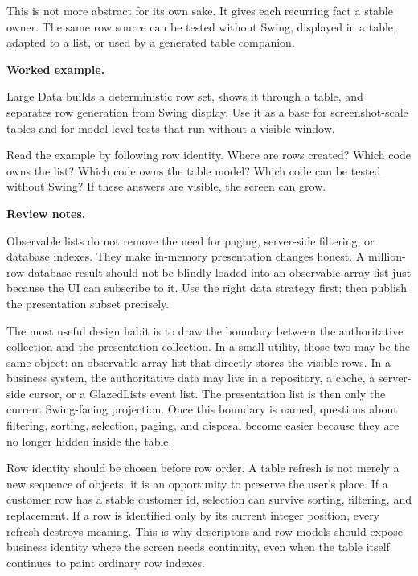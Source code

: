 This is not more abstract for its own sake. It gives each recurring fact a
stable owner. The same row source can be tested without Swing, displayed in a
table, adapted to a list, or used by a generated table companion.

\textbf{Worked example.}

\begin{examplebox}{Large Data}
\largeDataExample{} builds a deterministic row set, shows it through a table,
and separates row generation from Swing display. Use it as a base for
screenshot-scale tables and for model-level tests that run without a visible
window.
\end{examplebox}

Read the example by following row identity. Where are rows created? Which code
owns the list? Which code owns the table model? Which code can be tested without
Swing? If these answers are visible, the screen can grow.

\textbf{Review notes.}

Observable lists do not remove the need for paging, server-side filtering, or
database indexes. They make in-memory presentation changes honest. A million-row
database result should not be blindly loaded into an observable array list just
because the UI can subscribe to it. Use the right data strategy first; then
publish the presentation subset precisely.

The most useful design habit is to draw the boundary between the authoritative
collection and the presentation collection. In a small utility, those two may be
the same object: an observable array list that directly stores the visible rows.
In a business system, the authoritative data may live in a repository, a cache,
a server-side cursor, or a GlazedLists event list. The presentation list is then
only the current Swing-facing projection. Once this boundary is named, questions
about filtering, sorting, selection, paging, and disposal become easier because
they are no longer hidden inside the table.

Row identity should be chosen before row order. A table refresh is not merely a
new sequence of objects; it is an opportunity to preserve the user's place. If a
customer row has a stable customer id, selection can survive sorting, filtering,
and replacement. If a row is identified only by its current integer position,
every refresh destroys meaning. This is why descriptors and row models should
expose business identity where the screen needs continuity, even when the table
itself continues to paint ordinary row indexes.

